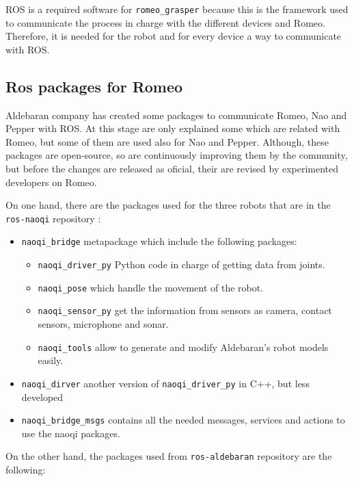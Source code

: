 \documentclass[12pt,a4paper,final,twoside,openright]{report}
\begin{document}
ROS is a required software for \texttt{romeo\_grasper} because this is the framework used to communicate the process in charge with the different devices and Romeo. Therefore, it is needed for the robot and for every device a way to communicate with ROS.

\subsection{Ros packages for Romeo}
\label{sec:romeo_ros}

Aldebaran company has created some packages to communicate Romeo, Nao and Pepper with ROS. At this stage are only explained some which are related with Romeo, but some of them are used also for Nao and Pepper. Although, these packages are open-source, so are continuously improving them by the community, but before the changes are released as oficial, their are revised by experimented developers on Romeo.

On one hand, there are the packages used for the three robots that are in the \texttt{ros-naoqi} repository \cite{ros-naoqi}:
\begin{itemize}
\item \texttt{naoqi\_bridge} metapackage which include the following packages:
\begin{itemize}
\item \texttt{naoqi\_driver\_py} Python code in charge of getting data from joints.
\item \texttt{naoqi\_pose} which handle the movement of the robot.
\item \texttt{naoqi\_sensor\_py} get the information from sensors as camera, contact sensors, microphone and sonar.
\item \texttt{naoqi\_tools} allow to generate and modify Aldebaran's robot models easily.
\end{itemize}
\item \texttt{naoqi\_dirver} another version of \texttt{naoqi\_driver\_py} in C++, but less developed 
\item \texttt{naoqi\_bridge\_msgs} contains all the needed messages, services and actions to use the naoqi packages.
\end{itemize}

On the other hand, the packages used from \texttt{ros-aldebaran} repository \cite{ros-aldebaran} are the following:
\end{document}
